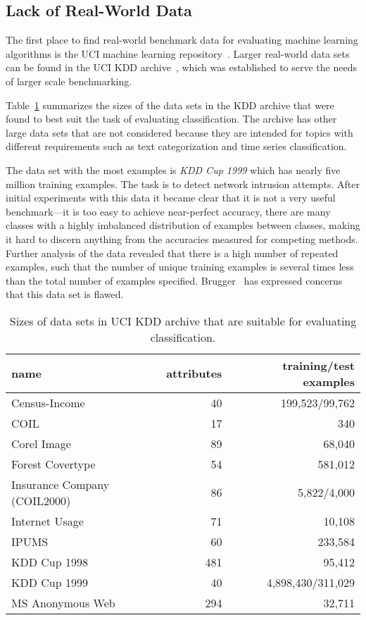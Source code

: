 \BEGINOMIT
\subsection{Lack of Real-World Data}
\label{sec:reallack}

The first place to find real-world benchmark data for evaluating machine learning algorithms is the UCI machine learning repository~\cite{uci}. Larger real-world data sets can be found in the UCI KDD archive~\cite{ucikdd}, which was established to serve the needs of larger scale benchmarking.

Table~\ref{tab:ucikddsizes} summarizes the sizes of the data sets in the KDD archive that were found to best suit the task of evaluating classification. The archive has other large data sets that are not considered because they are intended for topics with different requirements such as text categorization and time series classification.

The data set with the most examples is {\em KDD Cup 1999} which has nearly five million training examples. The task is to detect network intrusion attempts. After initial experiments with this data it became clear that it is not a very useful benchmark---it is too easy to achieve near-perfect accuracy, there are many classes with a highly imbalanced distribution of examples between classes, making it hard to discern anything from the accuracies measured for competing methods. Further analysis of the data revealed that there is a high number of repeated examples, such that the number of unique training examples is several times less than the total number of examples specified. Brugger~\cite{kdd99flaw} has expressed concerns that this data set is flawed.

\begin{table}
\caption{Sizes of data sets in UCI KDD archive that are suitable for evaluating classification.}
\centering
\begin{tabular}{|l|r|r|}
\hline					
name	&	attributes	&	training/test examples	\\
\hline					
Census-Income	&	40	&	199,523/99,762	\\
COIL	&	17	&	340	\\
Corel Image	&	89	&	68,040	\\
Forest Covertype	&	54	&	581,012	\\
Insurance Company (COIL2000)	&	86	&	5,822/4,000	\\
Internet Usage	&	71	&	10,108	\\
IPUMS	&	60	&	233,584	\\
KDD Cup 1998	&	481	&	95,412	\\
KDD Cup 1999	&	40	&	4,898,430/311,029	\\
MS Anonymous Web	&	294	&	32,711	\\
\hline					
\end{tabular}
\label{tab:ucikddsizes}
\end{table}

